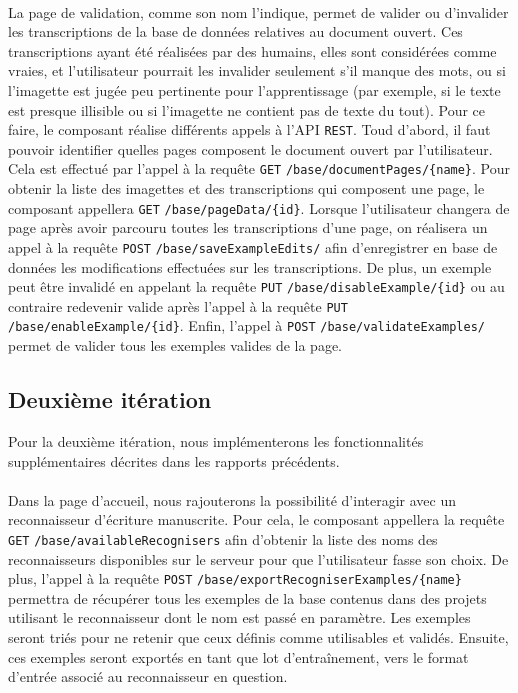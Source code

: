 \paragraph{}
La page de validation, comme son nom l’indique, permet de valider ou d’invalider les transcriptions de la base de données relatives au document ouvert. Ces transcriptions ayant été réalisées par des humains, elles sont considérées comme vraies, et l’utilisateur pourrait les invalider seulement s’il manque des mots, ou si l’imagette est jugée peu pertinente pour l’apprentissage (par exemple, si le texte est presque illisible ou si l’imagette ne contient pas de texte du tout).
\newline{}
Pour ce faire, le composant réalise différents appels à l'API \texttt{REST}. Toud d'abord, il faut pouvoir identifier quelles pages composent le document ouvert par l'utilisateur. Cela est effectué par l'appel à la requête \texttt{GET} \texttt{/base/documentPages/\{name\}}. Pour obtenir la liste des imagettes et des transcriptions qui composent une page, le composant appellera \texttt{GET} \texttt{/base/pageData/\{id\}}. Lorsque l'utilisateur changera de page après avoir parcouru toutes les transcriptions d'une page, on réalisera un appel à la requête \texttt{POST} \texttt{/base/saveExampleEdits/} afin d'enregistrer en base de données les modifications effectuées sur les transcriptions. De plus, un exemple peut être invalidé en appelant la requête \texttt{PUT} \texttt{/base/disableExample/\{id\}} ou au contraire redevenir valide après l'appel à la requête \texttt{PUT} \texttt{/base/enableExample/\{id\}}. Enfin, l'appel à \texttt{POST} \texttt{/base/validateExamples/} permet de valider tous les exemples valides de la page.


\newpage{}

\subsection{Deuxième itération}

Pour la deuxième itération, nous implémenterons les fonctionnalités supplémentaires décrites dans les rapports précédents.

\paragraph{}
Dans la page d'accueil, nous rajouterons la possibilité d'interagir avec un reconnaisseur d'écriture manuscrite. Pour cela, le composant appellera la requête \texttt{GET} \texttt{/base/availableRecognisers} afin d'obtenir la liste des noms des reconnaisseurs disponibles sur le serveur pour que l'utilisateur fasse son choix. De plus, l'appel à la requête \texttt{POST} \texttt{/base/exportRecogniserExamples/\{name\}} permettra de récupérer tous les exemples de la base contenus dans des projets utilisant le reconnaisseur dont le nom est passé en paramètre. Les exemples seront triés pour ne retenir que ceux définis comme utilisables et validés. Ensuite, ces exemples seront exportés en tant que lot d'entraînement, vers le format d'entrée associé au reconnaisseur en question.


